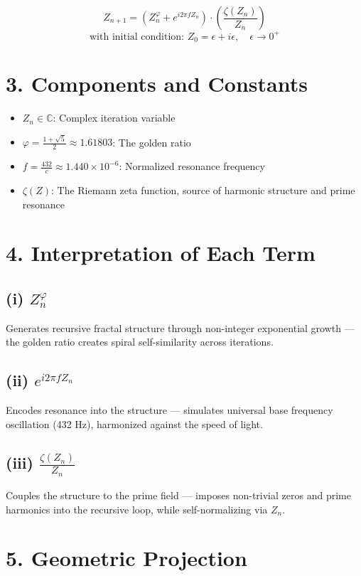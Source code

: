 \[
Z_{n+1} = \left( Z_n^\varphi + e^{i 2\pi f Z_n} \right) \cdot \left( \frac{\zeta(Z_n)}{Z_n} \right)
\]
\[
\text{with initial condition: } Z_0 = \epsilon + i\epsilon, \quad \epsilon \to 0^+
\]

\section*{3. Components and Constants}

\begin{itemize}
  \item \( Z_n \in \mathbb{C} \): Complex iteration variable
  \item \( \varphi = \frac{1+\sqrt{5}}{2} \approx 1.61803 \): The golden ratio
  \item \( f = \frac{432}{c} \approx 1.440 \times 10^{-6} \): Normalized resonance frequency
  \item \( \zeta(Z) \): The Riemann zeta function, source of harmonic structure and prime resonance
\end{itemize}

\section*{4. Interpretation of Each Term}

\subsection*{(i) \( Z_n^\varphi \)}
Generates recursive fractal structure through non-integer exponential growth — the golden ratio creates spiral self-similarity across iterations.

\subsection*{(ii) \( e^{i 2\pi f Z_n} \)}
Encodes resonance into the structure — simulates universal base frequency oscillation (432 Hz), harmonized against the speed of light.

\subsection*{(iii) \( \frac{\zeta(Z_n)}{Z_n} \)}
Couples the structure to the prime field — imposes non-trivial zeros and prime harmonics into the recursive loop, while self-normalizing via \( Z_n \).

\section*{5. Geometric Projection}

